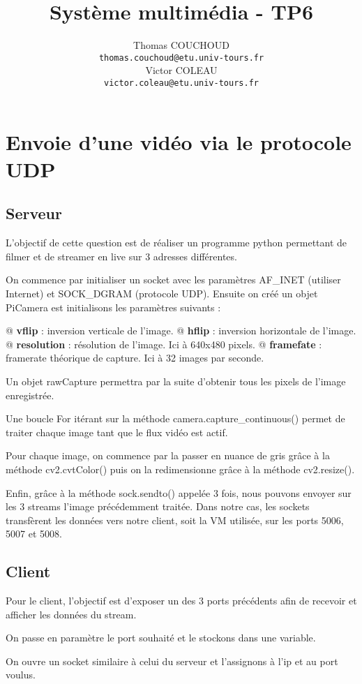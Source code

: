 \documentclass{report}
\title{Système multimédia - TP6}
\author{Thomas COUCHOUD\\\texttt{thomas.couchoud@etu.univ-tours.fr}\\Victor COLEAU\\\texttt{victor.coleau@etu.univ-tours.fr}}
\begin{document}
	\mccTitle

	\chapter{Envoie d’une vidéo via le protocole UDP}
		\section{Serveur}
			L'objectif de cette question est de réaliser un programme python permettant de filmer et de streamer en live sur 3 adresses différentes.
	
			On commence par initialiser un socket avec les paramètres AF\_INET (utiliser Internet) et SOCK\_DGRAM (protocole UDP).
			Ensuite on créé un objet PiCamera est initialisons les paramètres suivants :
			\begin{easylist}[itemize]
				@ \textbf{vflip} : inversion verticale de l'image.
				@ \textbf{hflip} : inversion horizontale de l'image.
				@ \textbf{resolution} : résolution de l'image. Ici à 640x480 pixels.
				@ \textbf{framefate} : framerate théorique de capture. Ici à 32 images par seconde.
			\end{easylist} 
	
			Un objet rawCapture permettra par la suite d'obtenir tous les pixels de l'image enregistrée.
	
			Une boucle For itérant sur la méthode camera.capture\_continuous() permet de traiter chaque image tant que le flux vidéo est actif.
	
			Pour chaque image, on commence par la passer en nuance de gris grâce à la méthode cv2.cvtColor() puis on la redimensionne grâce à la méthode cv2.resize().
	
			Enfin, grâce à la méthode sock.sendto() appelée 3 fois, nous pouvons envoyer sur les 3 streams l'image précédemment traitée. Dans notre cas, les sockets transfèrent les données vers notre client, soit la VM utilisée, sur les ports 5006, 5007 et 5008.

		\section{Client}
			Pour le client, l'objectif est d'exposer un des 3 ports précédents afin de recevoir et afficher les données du stream.
	
			On passe en paramètre le port souhaité et le stockons dans une variable.
	
			On ouvre un socket similaire à celui du serveur et l'assignons à l'ip et au port voulus.
	
\end{document}
